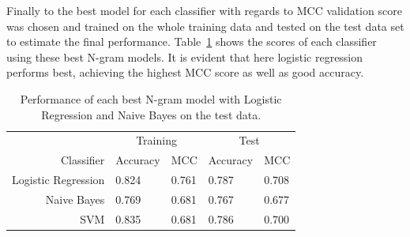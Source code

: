 Finally to the best model for each classifier with regards to \gls{MCC} validation score was chosen and trained on the whole training data and tested on the test data set to estimate the final performance. Table~\ref{tab:Ngram Grid Search Scores} shows the scores of each classifier using these best N-gram models. It is evident that here logistic regression performs best, achieving the highest \gls{MCC} score as well as good accuracy.

\begin{table}
  \begin{center}
  \begin{tabular}{ r | *2l | *2l }
    \toprule
     & \multicolumn{2}{c|}{Training} & \multicolumn{2}{c}{Test}\\
    Classifier & Accuracy & MCC & Accuracy & MCC \\
    \midrule
    Logistic Regression & 0.824 & 0.761 & 0.787 & 0.708 \\
    Naive Bayes         & 0.769 & 0.681 & 0.767 & 0.677 \\
    SVM                 & 0.835 & 0.681 & 0.786 & 0.700 \\
    \bottomrule
  \end{tabular}
  \caption{Performance of each best N-gram model with Logistic Regression and Naive Bayes on the test data.}
\label{tab:Ngram Grid Search Scores}
\end{center}
\end{table}

